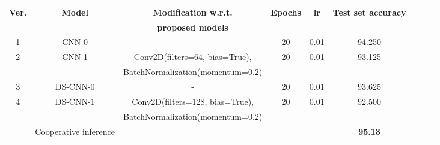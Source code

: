 \documentclass{article}
\begin{document}
\vspace{0.2cm}

\begin{center}
\begin{tabular}{ |c|c|c|c|c|c|c|c|c| } 
\hline
\vspace{-0.09cm}

\textbf{Ver.} &\textbf{Model} &\textbf{Modification w.r.t.} &\textbf{Epochs}&\textbf{lr} &\textbf{Test set accuracy}\\
\textbf{} &\textbf{} &\textbf{proposed models} &\textbf{}&\textbf{} &\textbf{}\\
\hline
1 & CNN-0 &-& 20 & 0.01 & 94.250\\
\hline
2 & CNN-1&Conv2D(filters=64, bias=True),&20&0.01&93.125\\
&&BatchNormalization(momentum=0.2)&&&\\
\hline
3 & DS-CNN-0&-&20&0.01&93.625\\
\hline
4 & DS-CNN-1&Conv2D(filters=128, bias=True),&20&0.01&92.500\\
&& BatchNormalization(momentum=0.2)&&&\\
\hline\hline
&Cooperative inference &&&&\textbf{95.13} \\
\hline
\end{tabular}

\end{center}
\end{document}
